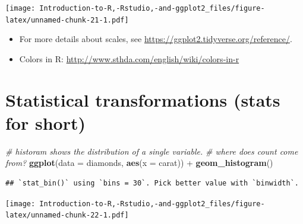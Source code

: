 \documentclass[]{book}
\newenvironment{Shaded}{\begin{snugshade}}{\end{snugshade}}
\newcommand{\KeywordTok}[1]{\textcolor[rgb]{0.13,0.29,0.53}{\textbf{{#1}}}}
\newcommand{\DataTypeTok}[1]{\textcolor[rgb]{0.13,0.29,0.53}{{#1}}}
\newcommand{\StringTok}[1]{\textcolor[rgb]{0.31,0.60,0.02}{{#1}}}
\newcommand{\CommentTok}[1]{\textcolor[rgb]{0.56,0.35,0.01}{\textit{{#1}}}}
\newcommand{\NormalTok}[1]{{#1}}
\begin{document}
\texttt{[image: Introduction-to-R,-Rstudio,-and-ggplot2\_files/figure-latex/unnamed-chunk-21-1.pdf]}

\begin{itemize}
\item
  For more details about scales, see
  \url{https://ggplot2.tidyverse.org/reference/}.
\item
  Colors in R: \url{http://www.sthda.com/english/wiki/colors-in-r}
\end{itemize}

\section{\texorpdfstring{Statistical transformations (\textbf{stats} for
short)}{Statistical transformations (stats for short)}}\label{statistical-transformations-stats-for-short}

\begin{Shaded}
\begin{Highlighting}[]
\CommentTok{# historam shows the distribution of a single variable. }
\CommentTok{# where does count come from? }
\KeywordTok{ggplot}\NormalTok{(}\DataTypeTok{data =} \NormalTok{diamonds, }\KeywordTok{aes}\NormalTok{(}\DataTypeTok{x =} \NormalTok{carat)) +}\StringTok{ }\KeywordTok{geom_histogram}\NormalTok{()}
\end{Highlighting}
\end{Shaded}

\begin{verbatim}
## `stat_bin()` using `bins = 30`. Pick better value with `binwidth`.
\end{verbatim}

\texttt{[image: Introduction-to-R,-Rstudio,-and-ggplot2\_files/figure-latex/unnamed-chunk-22-1.pdf]}
\end{document}
